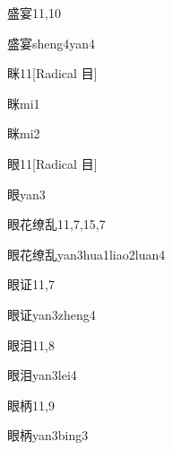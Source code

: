 \begin{entry}{盛宴}{11,10}
  \begin{phonetics}{盛宴}{sheng4yan4}
  \end{phonetics}
\end{entry}

\begin{entry}{眯}{11}[Radical 目]
  \begin{phonetics}{眯}{mi1}
  \end{phonetics}
  \begin{phonetics}{眯}{mi2}
  \end{phonetics}
\end{entry}

\begin{entry}{眼}{11}[Radical 目]
  \begin{phonetics}{眼}{yan3}
  \end{phonetics}
\end{entry}

\begin{entry}{眼花缭乱}{11,7,15,7}
  \begin{phonetics}{眼花缭乱}{yan3hua1liao2luan4}
  \end{phonetics}
\end{entry}

\begin{entry}{眼证}{11,7}
  \begin{phonetics}{眼证}{yan3zheng4}
  \end{phonetics}
\end{entry}

\begin{entry}{眼泪}{11,8}
  \begin{phonetics}{眼泪}{yan3lei4}
  \end{phonetics}
\end{entry}

\begin{entry}{眼柄}{11,9}
  \begin{phonetics}{眼柄}{yan3bing3}
  \end{phonetics}
\end{entry}

